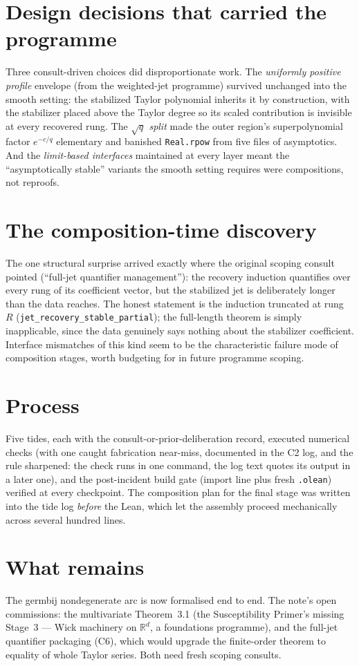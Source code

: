 \documentclass[11pt]{article}
\begin{document}
\section{Design decisions that carried the programme}

Three consult-driven choices did disproportionate work. The
\emph{uniformly positive profile} envelope (from the weighted-jet
programme) survived unchanged into the smooth setting: the stabilized
Taylor polynomial inherits it by construction, with the stabilizer
placed above the Taylor degree so its scaled contribution is
invisible at every recovered rung. The \emph{$\sqrt{q}$ split} made
the outer region's superpolynomial factor $e^{-c/q}$ elementary and
banished \texttt{Real.rpow} from five files of asymptotics. And the
\emph{limit-based interfaces} maintained at every layer meant the
``asymptotically stable'' variants the smooth setting requires were
compositions, not reproofs.

\section{The composition-time discovery}

The one structural surprise arrived exactly where the original
scoping consult pointed (``full-jet quantifier management''): the
recovery induction quantifies over every rung of its coefficient
vector, but the stabilized jet is deliberately longer than the data
reaches. The honest statement is the induction truncated at rung $R$
(\texttt{jet\_recovery\_stable\_partial}); the full-length theorem is
simply inapplicable, since the data genuinely says nothing about the
stabilizer coefficient. Interface mismatches of this kind seem to be
the characteristic failure mode of composition stages, worth
budgeting for in future programme scoping.

\section{Process}

Five tides, each with the consult-or-prior-deliberation record,
executed numerical checks (with one caught fabrication near-miss,
documented in the C2 log, and the rule sharpened: the check runs in
one command, the log text quotes its output in a later one), and the
post-incident build gate (import line plus fresh \texttt{.olean})
verified at every checkpoint. The composition plan for the final
stage was written into the tide log \emph{before} the Lean, which let
the assembly proceed mechanically across several hundred lines.

\section{What remains}

The germbij nondegenerate arc is now formalised end to end. The
note's open commissions: the multivariate Theorem~3.1 (the
Susceptibility Primer's missing Stage~3 --- Wick machinery on
$\mathbb{R}^d$, a foundations programme), and the full-jet quantifier
packaging (C6), which would upgrade the finite-order theorem to
equality of whole Taylor series. Both need fresh scoping consults.
\end{document}
